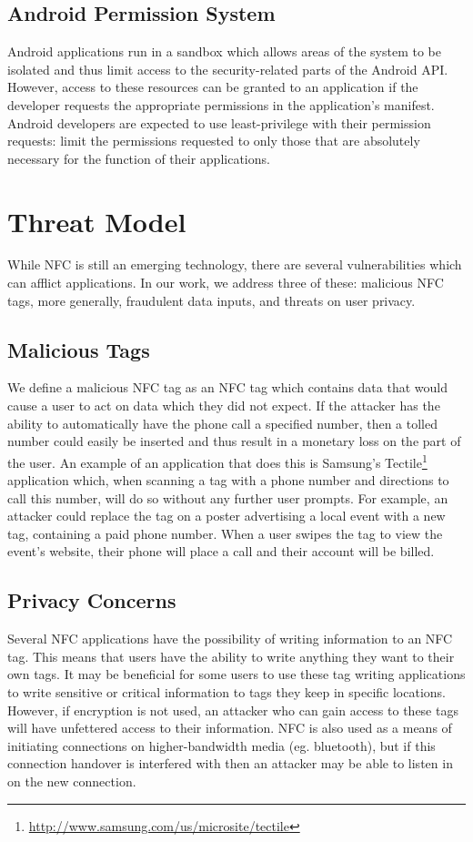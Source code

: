 \documentclass[12pt]{article}
\newcommand\TODO[1]{\textcolor{red}{#1}}
\begin{document}
\subsection{Android Permission System}
Android applications run in a sandbox which allows areas of the system to be isolated and thus limit access to the security-related parts of the Android API.
However, access to these resources can be granted to an application if the developer requests the appropriate permissions in the application's manifest.
Android developers are expected to use least-privilege with their permission requests: limit the permissions requested to only those that are absolutely necessary for the function of their applications. 

\section{Threat Model}
While NFC is still an emerging technology, there are several vulnerabilities which can afflict applications.
In our work, we address three of these: malicious NFC tags, more generally, fraudulent data inputs, and threats on user privacy.
\subsection{Malicious Tags}
We define a malicious NFC tag as an NFC tag which contains data that would cause a user to act on data which they did not expect.
If the attacker has the ability to automatically have the phone call a specified number, then a tolled number could easily be inserted and thus result in a monetary loss on the part of the user. 
An example of an application that does this is Samsung's Tectile\footnote{\url{http://www.samsung.com/us/microsite/tectile}} application which, when scanning a tag with a phone number and directions to call this number, will do so without any further user prompts.
For example, an attacker could replace the tag on a poster advertising a local event with a new tag, containing a paid phone number.
When a user swipes the tag to view the event's website, their phone will place a call and their account will be billed.

\subsection{Privacy Concerns}
Several NFC applications have the possibility of writing information to an NFC tag.
This means that users have the ability to write anything they want to their own tags.
It may be beneficial for some users to use these tag writing applications to write sensitive or critical information to tags they keep in specific locations.
However, if encryption is not used, an attacker who can gain access to these tags will have unfettered access to their information.
NFC is also used as a means of initiating connections on higher-bandwidth media (eg. bluetooth), but if this connection handover is interfered with then an attacker may be able to listen in on the new connection.
\end{document}
